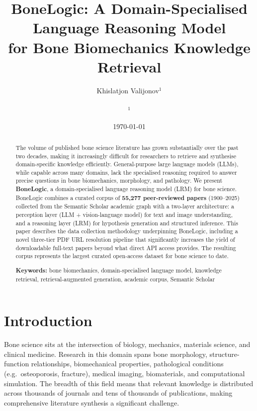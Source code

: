 \documentclass[12pt, a4paper]{article}
\title{
    \textbf{BoneLogic: A Domain-Specialised Language Reasoning Model \\
    for Bone Biomechanics Knowledge Retrieval}
}
\author{
    Khislatjon Valijonov$^{1}$ \\
    \\
    \small $^{1}$ %
}
\date{\today}
\begin{document}
\maketitle

\begin{abstract}
The volume of published bone science literature has grown substantially over the past two decades,
making it increasingly difficult for researchers to retrieve and synthesise domain-specific knowledge
efficiently. General-purpose large language models (LLMs), while capable across many domains, lack
the specialised reasoning required to answer precise questions in bone biomechanics, morphology,
and pathology. We present \textbf{BoneLogic}, a domain-specialised language reasoning model (LRM)
for bone science. BoneLogic combines a curated corpus of \textbf{55,277 peer-reviewed papers}
(1900--2025) collected from the Semantic Scholar academic graph with a two-layer architecture:
a perception layer (LLM + vision-language model) for text and image understanding, and a reasoning
layer (LRM) for hypothesis generation and structured inference. This paper describes the data
collection methodology underpinning BoneLogic, including a novel three-tier PDF URL resolution
pipeline that significantly increases the yield of downloadable full-text papers beyond what
direct API access provides. The resulting corpus represents the largest curated open-access
dataset for bone science to date.

\bigskip
\noindent\textbf{Keywords:} bone biomechanics, domain-specialised language model, knowledge
retrieval, retrieval-augmented generation, academic corpus, Semantic Scholar
\end{abstract}

\newpage

\section{Introduction}
\label{sec:intro}

Bone science sits at the intersection of biology, mechanics, materials science, and clinical medicine.
Research in this domain spans bone morphology, structure-function relationships,
biomechanical properties, pathological conditions (e.g.\ osteoporosis, fracture),
medical imaging, biomaterials, and computational simulation. The breadth of this field
means that relevant knowledge is distributed across thousands of journals and tens of
thousands of publications, making comprehensive literature synthesis a significant challenge.
\end{document}

